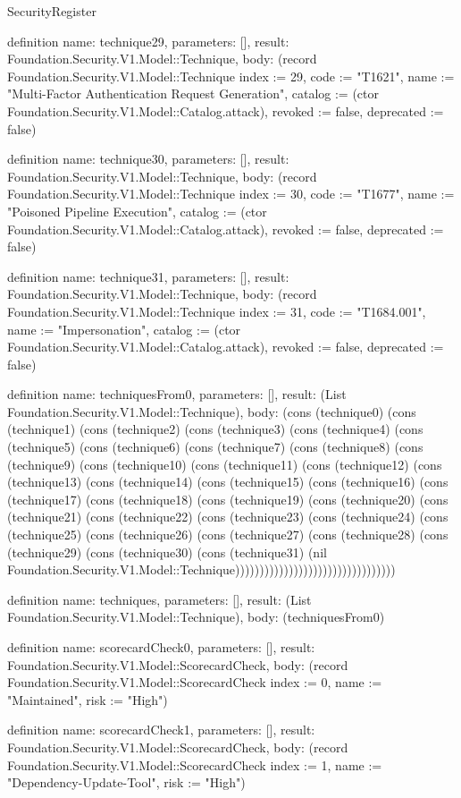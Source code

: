 \begin{lexlean}{SecurityRegister}
\begin{semanticmodule}
definition{
  name: technique29,
  parameters: [],
  result: Foundation.Security.V1.Model::Technique,
  body: (record Foundation.Security.V1.Model::Technique {index := 29, code := "T1621", name := "Multi-Factor Authentication Request Generation", catalog := (ctor Foundation.Security.V1.Model::Catalog.attack), revoked := false, deprecated := false})
}

definition{
  name: technique30,
  parameters: [],
  result: Foundation.Security.V1.Model::Technique,
  body: (record Foundation.Security.V1.Model::Technique {index := 30, code := "T1677", name := "Poisoned Pipeline Execution", catalog := (ctor Foundation.Security.V1.Model::Catalog.attack), revoked := false, deprecated := false})
}

definition{
  name: technique31,
  parameters: [],
  result: Foundation.Security.V1.Model::Technique,
  body: (record Foundation.Security.V1.Model::Technique {index := 31, code := "T1684.001", name := "Impersonation", catalog := (ctor Foundation.Security.V1.Model::Catalog.attack), revoked := false, deprecated := false})
}

definition{
  name: techniquesFrom0,
  parameters: [],
  result: (List Foundation.Security.V1.Model::Technique),
  body: (cons (technique0) (cons (technique1) (cons (technique2) (cons (technique3) (cons (technique4) (cons (technique5) (cons (technique6) (cons (technique7) (cons (technique8) (cons (technique9) (cons (technique10) (cons (technique11) (cons (technique12) (cons (technique13) (cons (technique14) (cons (technique15) (cons (technique16) (cons (technique17) (cons (technique18) (cons (technique19) (cons (technique20) (cons (technique21) (cons (technique22) (cons (technique23) (cons (technique24) (cons (technique25) (cons (technique26) (cons (technique27) (cons (technique28) (cons (technique29) (cons (technique30) (cons (technique31) (nil Foundation.Security.V1.Model::Technique)))))))))))))))))))))))))))))))))
}

definition{
  name: techniques,
  parameters: [],
  result: (List Foundation.Security.V1.Model::Technique),
  body: (techniquesFrom0)
}

definition{
  name: scorecardCheck0,
  parameters: [],
  result: Foundation.Security.V1.Model::ScorecardCheck,
  body: (record Foundation.Security.V1.Model::ScorecardCheck {index := 0, name := "Maintained", risk := "High"})
}

definition{
  name: scorecardCheck1,
  parameters: [],
  result: Foundation.Security.V1.Model::ScorecardCheck,
  body: (record Foundation.Security.V1.Model::ScorecardCheck {index := 1, name := "Dependency-Update-Tool", risk := "High"})
}


\end{semanticmodule}
\end{lexlean}
